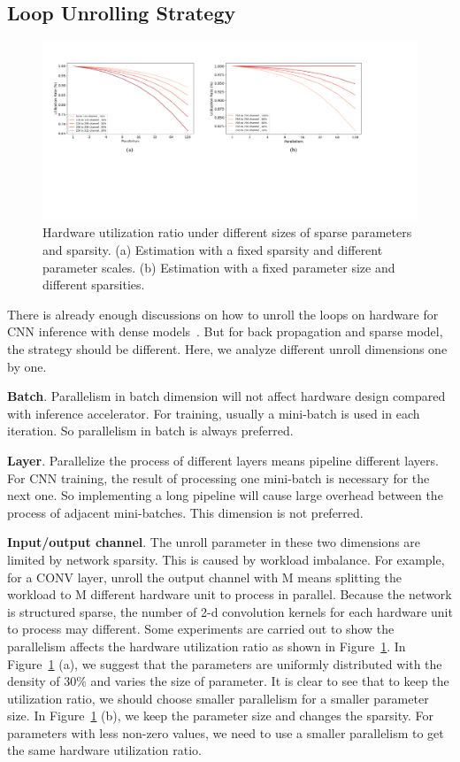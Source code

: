 \subsection{Loop Unrolling Strategy}\label{sec:hw_unroll}
\begin{figure}[t]
  \centering
  \includegraphics[width=2.0\columnwidth]{figures/util_sim.pdf}
  \caption{Hardware utilization ratio under different sizes of sparse parameters and sparsity. (a) Estimation with a fixed sparsity and different parameter scales. (b) Estimation with a fixed parameter size and different sparsities.}
  \label{fig:util_sim}
\end{figure}

There is already enough discussions on how to unroll the loops on hardware for CNN inference with dense models~\cite{zhang2015optimizing,mao2017exploring}. But for back propagation and sparse model, the strategy should be different. Here, we analyze different unroll dimensions one by one.

{\bf{Batch}}. Parallelism in batch dimension will not affect hardware design compared with inference accelerator. For training, usually a mini-batch is used in each iteration. So parallelism in batch is always preferred.

{\bf{Layer}}. Parallelize the process of different layers means pipeline different layers. For CNN training, the result of processing one mini-batch is necessary for the next one. So implementing a long pipeline will cause large overhead between the process of adjacent mini-batches. This dimension is not preferred.

{\bf{Input/output channel}}. The unroll parameter in these two dimensions are limited by network sparsity. This is caused by workload imbalance. For example, for a CONV layer, unroll the output channel with M means splitting the workload to M different hardware unit to process in parallel. Because the network is structured sparse, the number of 2-d convolution kernels for each hardware unit to process may different. Some experiments are carried out to show the parallelism affects the hardware utilization ratio as shown in Figure~\ref{fig:util_sim}. In Figure~\ref{fig:util_sim} (a), we suggest that the parameters are uniformly distributed with the density of $30\%$ and varies the size of parameter. It is clear to see that to keep the utilization ratio, we should choose smaller parallelism for a smaller parameter size. In Figure~\ref{fig:util_sim} (b), we keep the parameter size and changes the sparsity. For parameters with less non-zero values, we need to use a smaller parallelism to get the same hardware utilization ratio.

